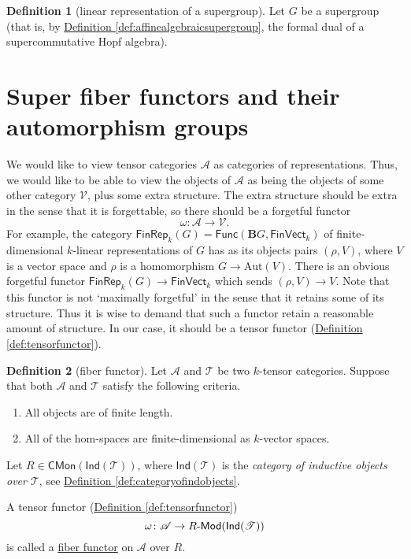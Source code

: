 \documentclass[a4paper,10pt]{scrreprt}
\newcommand{\defn}[1]{\ul{#1}}
\def\mhyp{{\hbox{-}}}
\theoremstyle{definition}
\newtheorem{definition}{Definition}[section]
\theoremstyle{plain}
\theoremstyle{remark}
\begin{document}
\begin{definition}[linear representation of a supergroup]
  \label{def:linearrepresentationofsupergroup}
  Let $G$ be a supergroup (that is, by \hyperref[def:affinealgebraicsupergroup]{Definition \ref*{def:affinealgebraicsupergroup}}, the formal dual of a supercommutative Hopf algebra).
\end{definition}

\section{Super fiber functors and their automorphism groups}
We would like to view tensor categories $\mathscr{A}$ as categories of representations. Thus, we would like to be able to view the objects of $\mathscr{A}$ as being the objects of some other category $\mathscr{V}$, plus some extra structure. The extra structure should be extra in the sense that it is forgettable, so there should be a forgetful functor
\begin{equation*}
  \omega\colon \mathscr{A} \rightarrow \mathscr{V}.
\end{equation*}
For example, the category $\mathsf{FinRep}_{k}(G) = \mathsf{Func}(\mathbf{B}G, \mathsf{FinVect}_{k})$ of finite-dimensional $k$-linear representations of $G$ has as its objects pairs $(\rho, V)$, where $V$ is a vector space and $\rho$ is a homomorphism $G \to \mathrm{Aut}(V)$. There is an obvious forgetful functor $\mathsf{FinRep}_{k}(G) \to \mathsf{FinVect}_{k}$ which sends $(\rho, V) \to V$. Note that this functor is not `maximally forgetful' in the sense that it retains some of its structure. Thus it is wise to demand that such a functor retain a reasonable amount of structure. In our case, it should be a tensor functor (\hyperref[def:tensorfunctor]{Definition \ref*{def:tensorfunctor}}).

\begin{definition}[fiber functor]
  \label{def:fiberfunctor}
  Let $\mathscr{A}$ and $\mathscr{T}$ be two $k$-tensor categories. Suppose that both $\mathscr{A}$ and $\mathscr{T}$ satisfy the following criteria.
  \begin{enumerate}
    \item All objects are of finite length.

    \item All of the hom-spaces are finite-dimensional as $k$-vector spaces.
  \end{enumerate}

  Let $R \in \mathsf{CMon}(\mathsf{Ind}(\mathscr{T}))$, where $\mathsf{Ind}(\mathscr{T})$ is the \emph{category of inductive objects over $\mathscr{T}$}, see \hyperref[def:categoryofindobjects]{Definition \ref*{def:categoryofindobjects}}.

  A tensor functor (\hyperref[def:tensorfunctor]{Definition \ref*{def:tensorfunctor}})
  \begin{equation*}
    \omega\colon \mathscr{A} \to R\mhyp\mathsf{Mod}(\mathsf{Ind}(\mathscr{T}))
  \end{equation*}
  is called a \defn{fiber functor} on $\mathscr{A}$ over $R$.
\end{definition}
\end{document}
